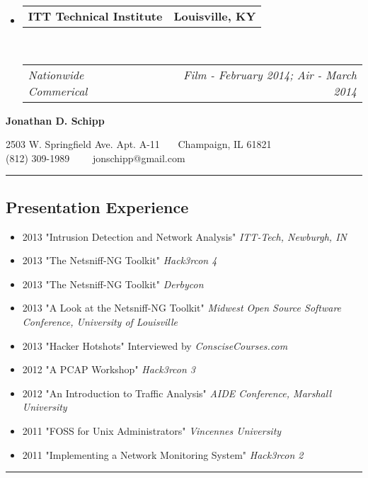 \documentclass[10pt,letterpaper]{article}
\makeatletter
\newcommand{\headerrow}[2]
{\begin{tabular*}{\linewidth}{l@{\extracolsep{\fill}}r}
	#1 &
	#2 \\
\end{tabular*}}
\makeatother
\begin{document}
\begin{itemize}
	\parskip=0.1em

	\item
	\headerrow
		{\textbf{ITT Technical Institute}}
		{\textbf{Louisville, KY}}
	\\
	\headerrow
		{\emph{Nationwide Commerical}}
		{\emph{Film - February 2014; Air - March 2014}}
\end{itemize}

\newpage

\begin{center}
{\LARGE \textbf{Jonathan D. Schipp}}

2503 W. Springfield Ave. Apt. A-11\ \textbullet
\ \ Champaign, IL 61821
\\
(812) 309-1989\ \ \textbullet
\ \ jonschipp@gmail.com
\end{center}

\hrule
\vspace{-0.4em}
\subsection*{Presentation Experience}

\begin{itemize}
	\parskip=0.1em
	\item \textsc{2013} "Intrusion Detection and Network Analysis" \textit{ITT-Tech, Newburgh, IN}
	\item \textsc{2013} "The Netsniff-NG Toolkit" \textit{Hack3rcon 4}
	\item \textsc{2013} "The Netsniff-NG Toolkit" \textit{Derbycon}
	\item \textsc{2013} "A Look at the Netsniff-NG Toolkit" \textit{Midwest Open Source Software Conference, University of Louisville}
	\item \textsc{2013} "Hacker Hotshots" Interviewed by \textit{ConsciseCourses.com}
	\item \textsc{2012} "A PCAP Workshop" \textit{Hack3rcon 3}
	\item \textsc{2012} "An Introduction to Traffic Analysis" \textit{AIDE Conference, Marshall University}
	\item \textsc{2011} "FOSS for Unix Administrators" \textit{Vincennes University}
	\item \textsc{2011} "Implementing a Network Monitoring System" \textit{Hack3rcon 2}

\end{itemize}

\hrule
\vspace{-0.4em}
\end{document}
